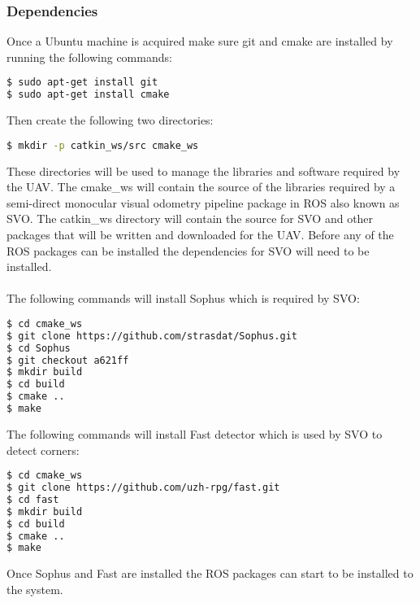 \subsubsection{Dependencies}
Once a Ubuntu machine is acquired make sure git and cmake are installed by running the following commands: 
\begin{lstlisting}[language=bash]
$ sudo apt-get install git
$ sudo apt-get install cmake
\end{lstlisting}
Then create the following two directories:
\begin{lstlisting}[language=bash]
$ mkdir -p catkin_ws/src cmake_ws
\end{lstlisting}
These directories will be used to manage the libraries and software required by the UAV. The cmake\_ws will contain the source of the libraries required by a semi-direct monocular visual odometry pipeline package in ROS also known as SVO. The catkin\_ws directory will contain the source for SVO and other packages that will be written and downloaded for the UAV. Before any of the ROS packages can be installed the dependencies for SVO will need to be installed. \\
\\
The following commands will install Sophus which is required by SVO:
\begin{lstlisting}[language=bash]
$ cd cmake_ws
$ git clone https://github.com/strasdat/Sophus.git
$ cd Sophus
$ git checkout a621ff
$ mkdir build
$ cd build
$ cmake ..
$ make
\end{lstlisting}
The following commands will install Fast detector which is used by SVO to detect corners:
\begin{lstlisting}[language=bash]
$ cd cmake_ws
$ git clone https://github.com/uzh-rpg/fast.git
$ cd fast
$ mkdir build
$ cd build
$ cmake ..
$ make
\end{lstlisting}
Once Sophus and Fast are installed the ROS packages can start to be installed to the system.
